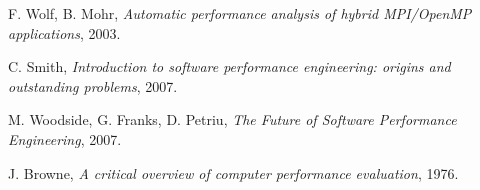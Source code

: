 \documentclass[a4paper,twocolumn]{article}
\begin{document}
\begin{thebibliography}{9}
 F. Wolf, B. Mohr,
 \emph{Automatic performance analysis of hybrid MPI/OpenMP applications},
 2003.

 C. Smith,
 \emph{Introduction to software performance engineering: origins and outstanding problems},
 2007.

 M. Woodside, G. Franks, D. Petriu,
 \emph{The Future of Software Performance Engineering},
 2007.

 J. Browne,
 \emph{A critical overview of computer performance evaluation},
 1976.

\end{thebibliography}
\end{document}
